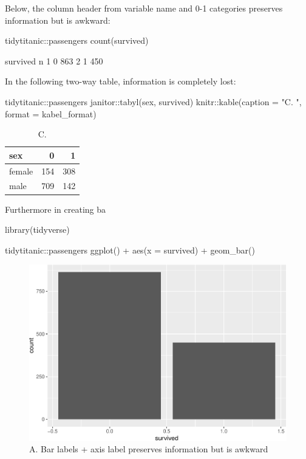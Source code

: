 Below, the column header from variable name and 0-1 categories preserves
information but is awkward:

\begin{Schunk}
\begin{Sinput}
tidytitanic::passengers %
  count(survived) 
\end{Sinput}
\begin{Soutput}
       survived   n
     1        0 863
     2        1 450
\end{Soutput}
\end{Schunk}

In the following two-way table, information is completely lost:

\begin{Schunk}
\begin{Sinput}
tidytitanic::passengers %
  janitor::tabyl(sex, survived) %
  knitr::kable(caption = "C. ", format = kabel_format)
\end{Sinput}
\begin{table}

\caption{\label{tab:unnamed-chunk-7}C. }
\centering
\begin{tabular}[t]{l|r|r}
\hline
sex & 0 & 1\\
\hline
female & 154 & 308\\
\hline
male & 709 & 142\\
\hline
\end{tabular}
\end{table}

\end{Schunk}

Furthermore in creating ba

\begin{Schunk}
\begin{Sinput}
library(tidyverse)

tidytitanic::passengers %
  ggplot() + 
  aes(x = survived) + 
  geom_bar()
\end{Sinput}
\begin{figure}
\includegraphics[width=0.69\linewidth]{r_journal_files/figure-latex/cars-1} \caption[A]{A. Bar labels + axis label preserves information but is awkward}\label{fig:cars}
\end{figure}
\end{Schunk}

